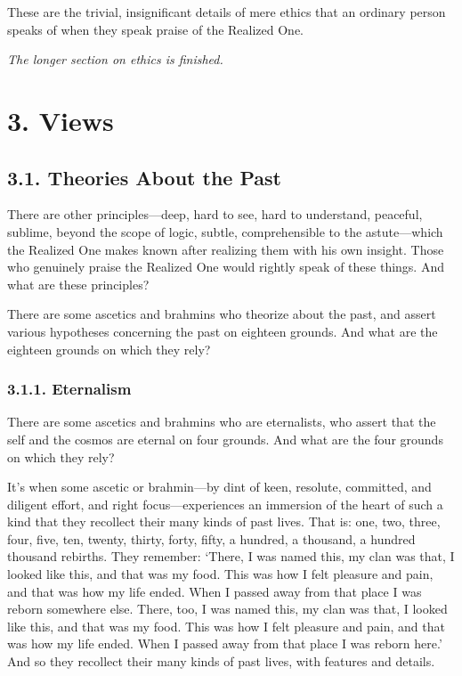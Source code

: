 \documentclass[12pt,openany]{book}%
\newcommand*{\scendsection}[1]{\begin{center}\textit{#1}\end{center}}
\begin{document}
These are the trivial, insignificant details of mere ethics that an ordinary person speaks of when they speak praise of the Realized One. 

\scendsection{The longer section on ethics is finished. }

\section*{3. Views }

\subsection*{3.1. Theories About the Past }

There are other principles—deep, hard to see, hard to understand, peaceful, sublime, beyond the scope of logic, subtle, comprehensible to the astute—which the Realized One makes known after realizing them with his own insight. Those who genuinely praise the Realized One would rightly speak of these things. And what are these principles? 

There are some ascetics and brahmins who theorize about the past, and assert various hypotheses concerning the past on eighteen grounds. And what are the eighteen grounds on which they rely? 

\subsubsection*{3.1.1. Eternalism }

There are some ascetics and brahmins who are eternalists, who assert that the self and the cosmos are eternal on four grounds. And what are the four grounds on which they rely? 

It’s when some ascetic or brahmin—by dint of keen, resolute, committed, and diligent effort, and right focus—experiences an immersion of the heart of such a kind that they recollect their many kinds of past lives. That is: one, two, three, four, five, ten, twenty, thirty, forty, fifty, a hundred, a thousand, a hundred thousand rebirths. They remember: ‘There, I was named this, my clan was that, I looked like this, and that was my food. This was how I felt pleasure and pain, and that was how my life ended. When I passed away from that place I was reborn somewhere else. There, too, I was named this, my clan was that, I looked like this, and that was my food. This was how I felt pleasure and pain, and that was how my life ended. When I passed away from that place I was reborn here.’ And so they recollect their many kinds of past lives, with features and details. 
\end{document}
